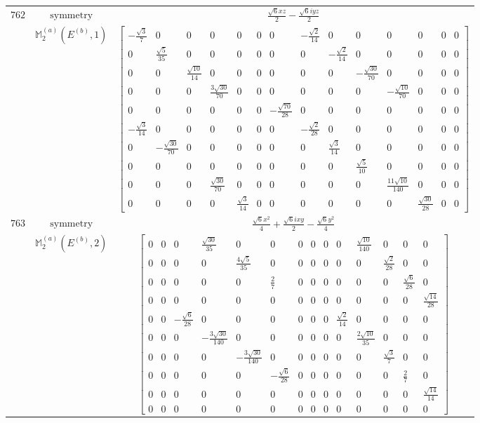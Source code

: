 \documentclass[fleqn,8pt,landscape]{jsarticle}
\begin{document}
\begin{longtable}{ccc}
$ 762 $ & $ \text{symmetry} $ & $ \frac{\sqrt{6} x z}{2} - \frac{\sqrt{6} i y z}{2} $ \\
$  $ & $ \mathbb{M}_{2}^{(a)}(E^{(b)},1) $ & $ \begin{bmatrix} - \frac{\sqrt{3}}{7} & 0 & 0 & 0 & 0 & 0 & 0 & - \frac{\sqrt{2}}{14} & 0 & 0 & 0 & 0 & 0 & 0 \\ 0 & \frac{\sqrt{5}}{35} & 0 & 0 & 0 & 0 & 0 & 0 & - \frac{\sqrt{2}}{14} & 0 & 0 & 0 & 0 & 0 \\ 0 & 0 & \frac{\sqrt{10}}{14} & 0 & 0 & 0 & 0 & 0 & 0 & - \frac{\sqrt{30}}{70} & 0 & 0 & 0 & 0 \\ 0 & 0 & 0 & \frac{3 \sqrt{30}}{70} & 0 & 0 & 0 & 0 & 0 & 0 & - \frac{\sqrt{10}}{70} & 0 & 0 & 0 \\ 0 & 0 & 0 & 0 & 0 & 0 & - \frac{\sqrt{70}}{28} & 0 & 0 & 0 & 0 & 0 & 0 & 0 \\ - \frac{\sqrt{3}}{14} & 0 & 0 & 0 & 0 & 0 & 0 & - \frac{\sqrt{2}}{28} & 0 & 0 & 0 & 0 & 0 & 0 \\ 0 & - \frac{\sqrt{30}}{70} & 0 & 0 & 0 & 0 & 0 & 0 & \frac{\sqrt{3}}{14} & 0 & 0 & 0 & 0 & 0 \\ 0 & 0 & 0 & 0 & 0 & 0 & 0 & 0 & 0 & \frac{\sqrt{5}}{10} & 0 & 0 & 0 & 0 \\ 0 & 0 & 0 & \frac{\sqrt{30}}{70} & 0 & 0 & 0 & 0 & 0 & 0 & \frac{11 \sqrt{10}}{140} & 0 & 0 & 0 \\ 0 & 0 & 0 & 0 & \frac{\sqrt{3}}{14} & 0 & 0 & 0 & 0 & 0 & 0 & \frac{\sqrt{30}}{28} & 0 & 0 \end{bmatrix} $ \\ \hline
$ 763 $ & $ \text{symmetry} $ & $ \frac{\sqrt{6} x^{2}}{4} + \frac{\sqrt{6} i x y}{2} - \frac{\sqrt{6} y^{2}}{4} $ \\
$  $ & $ \mathbb{M}_{2}^{(a)}(E^{(b)},2) $ & $ \begin{bmatrix} 0 & 0 & 0 & \frac{\sqrt{30}}{35} & 0 & 0 & 0 & 0 & 0 & 0 & \frac{\sqrt{10}}{140} & 0 & 0 & 0 \\ 0 & 0 & 0 & 0 & \frac{4 \sqrt{5}}{35} & 0 & 0 & 0 & 0 & 0 & 0 & \frac{\sqrt{2}}{28} & 0 & 0 \\ 0 & 0 & 0 & 0 & 0 & \frac{2}{7} & 0 & 0 & 0 & 0 & 0 & 0 & \frac{\sqrt{6}}{28} & 0 \\ 0 & 0 & 0 & 0 & 0 & 0 & 0 & 0 & 0 & 0 & 0 & 0 & 0 & \frac{\sqrt{14}}{28} \\ 0 & 0 & - \frac{\sqrt{6}}{28} & 0 & 0 & 0 & 0 & 0 & 0 & \frac{\sqrt{2}}{14} & 0 & 0 & 0 & 0 \\ 0 & 0 & 0 & - \frac{3 \sqrt{30}}{140} & 0 & 0 & 0 & 0 & 0 & 0 & \frac{2 \sqrt{10}}{35} & 0 & 0 & 0 \\ 0 & 0 & 0 & 0 & - \frac{3 \sqrt{30}}{140} & 0 & 0 & 0 & 0 & 0 & 0 & \frac{\sqrt{3}}{7} & 0 & 0 \\ 0 & 0 & 0 & 0 & 0 & - \frac{\sqrt{6}}{28} & 0 & 0 & 0 & 0 & 0 & 0 & \frac{2}{7} & 0 \\ 0 & 0 & 0 & 0 & 0 & 0 & 0 & 0 & 0 & 0 & 0 & 0 & 0 & \frac{\sqrt{14}}{14} \\ 0 & 0 & 0 & 0 & 0 & 0 & 0 & 0 & 0 & 0 & 0 & 0 & 0 & 0 \end{bmatrix} $ \\ \hline

\end{longtable}
\end{document}
